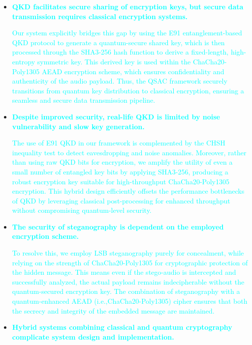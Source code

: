 \documentclass[a4paper]{cas-sc}
\begin{document}
\begin{itemize}
    \item \textcolor{cyan}{\textbf{QKD facilitates secure sharing of encryption keys, but secure data transmission requires classical encryption systems.}}

          \hspace{15pt}\textcolor{cyan}{Our system explicitly bridges this gap by using the E91 entanglement-based QKD protocol to generate a quantum-secure shared key, which is then processed through the SHA3-256 hash function to derive a fixed-length, high-entropy symmetric key. This derived key is used within the ChaCha20-Poly1305 AEAD encryption scheme, which ensures confidentiality and authenticity of the audio payload. Thus, the QSAC framework securely transitions from quantum key distribution to classical encryption, ensuring a seamless and secure data transmission pipeline.}
    \item \textcolor{cyan}{\textbf{Despite improved security, real-life QKD is limited by noise vulnerability and slow key generation.}}

          \hspace{15pt}\textcolor{cyan}{The use of E91 QKD in our framework is complemented by the CHSH inequality test to detect eavesdropping and noise anomalies. Moreover, rather than using raw QKD bits for encryption, we amplify the utility of even a small number of entangled key bits by applying SHA3-256, producing a robust encryption key suitable for high-throughput ChaCha20-Poly1305 encryption. This hybrid design efficiently offsets the performance bottlenecks of QKD by leveraging classical post-processing for enhanced throughput without compromising quantum-level security.}
    \item \textcolor{cyan}{\textbf{The security of steganography is dependent on the employed encryption scheme.}}

          \hspace{15pt}\textcolor{cyan}{To resolve this, we employ LSB steganography purely for concealment, while relying on the strength of ChaCha20-Poly1305 for cryptographic protection of the hidden message. This means even if the stego-audio is intercepted and successfully analyzed, the actual payload remains indecipherable without the quantum-secured encryption key. The combination of steganography with a quantum-enhanced AEAD (i.e.,ChaCha20-Poly1305) cipher ensures that both the secrecy and integrity of the embedded message are maintained.}
    \item \textcolor{cyan}{\textbf{Hybrid systems combining classical and quantum cryptography complicate system design and implementation.}}


\end{itemize}
\end{document}
